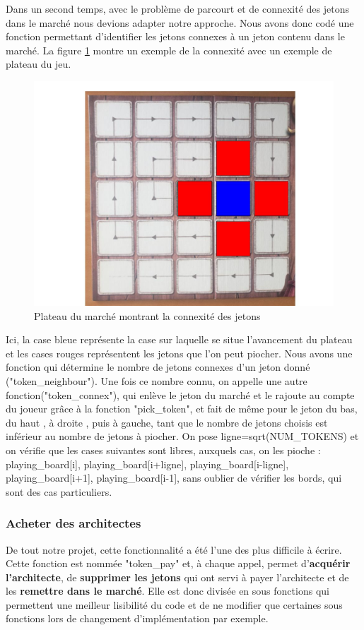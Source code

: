 \documentclass{article}
\begin{document}
    Dans un second temps, avec le problème de parcourt et de connexité des jetons dans le marché nous devions adapter notre approche. Nous avons donc codé une fonction permettant d'identifier les jetons connexes à un jeton contenu dans le marché. La figure \ref{jetons_connexes} montre un exemple de la connexité avec un exemple de plateau du jeu.

             
        \begin{figure}[!ht]
            \centering
            \includegraphics[width=0.4\linewidth]{jetons_connexes.jpg}
            \caption{Plateau du marché montrant la connexité des jetons}
            \label{jetons_connexes}
        \end{figure}
    
    Ici, la case bleue représente la case sur laquelle se situe l'avancement du plateau et les cases rouges représentent les jetons que l'on peut piocher. Nous avons une fonction qui détermine le nombre de jetons connexes d'un jeton donné ("token\_neighbour"). Une fois ce nombre connu, on appelle une autre fonction("token\_connex"), qui enlève le jeton du marché et le rajoute au compte du joueur grâce à la fonction "pick\_token", et fait de même pour le jeton du bas, du haut , à droite , puis à gauche, tant que le nombre de jetons choisis est inférieur au nombre de jetons à piocher.  On pose ligne=sqrt(NUM\_TOKENS) et on vérifie que les cases suivantes sont libres, auxquels cas, on les pioche : playing\_board[i], playing\_board[i+ligne], playing\_board[i-ligne], playing\_board[i+1], playing\_board[i-1], sans oublier de vérifier les bords, qui sont des cas particuliers.
    

    
    
    \subsubsection{Acheter des architectes} De tout notre projet, cette fonctionnalité a été l'une des plus difficile à écrire. Cette fonction est nommée "token\_pay" et, à chaque appel, permet d'\textbf{acquérir l'architecte}, de \textbf{supprimer les jetons} qui ont servi à payer l'architecte et de les \textbf{remettre dans le marché}. Elle est donc divisée en sous fonctions qui permettent une meilleur lisibilité du code et de ne modifier que certaines sous fonctions lors de changement d'implémentation par exemple.     
    
\end{document}
